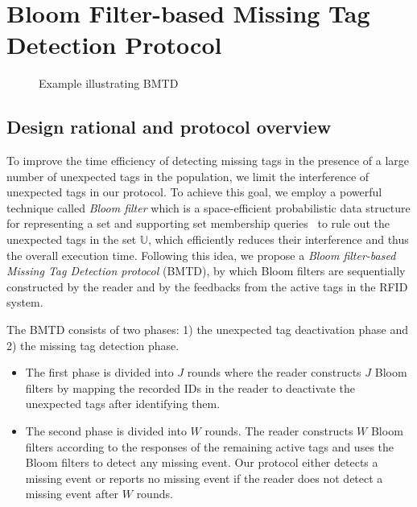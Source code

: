 \documentclass[10pt, twocolumn]{IEEEtran}
\begin{document}
\section{Bloom Filter-based Missing Tag Detection Protocol}
\label{sec:protocol}

\begin{figure*}[htbp]
\centering
{}
\caption{Example illustrating BMTD}
\end{figure*}

\subsection{Design rational and protocol overview}
To improve the time efficiency of detecting missing tags in the presence of a large number of unexpected tags in the population, we limit the interference of unexpected tags in our protocol. To achieve this goal, we employ a powerful technique called \textit{Bloom filter} which is a space-efficient probabilistic data structure for representing a set and supporting set membership queries~\cite{bloom1970space} to rule out the unexpected tags in the set $\mathbb{U}$, which efficiently reduces their interference and thus the overall execution time. Following this idea, we propose a \textit{Bloom filter-based Missing Tag Detection protocol} (BMTD), by which Bloom filters are sequentially constructed by the reader and by the feedbacks from the active tags in the RFID system.

The BMTD consists of two phases: 1) the unexpected tag deactivation phase and 2) the missing tag detection phase.
\begin{itemize}
\item The first phase is divided into $J$ rounds where the reader constructs $J$ Bloom filters by mapping the recorded IDs in the reader to deactivate the unexpected tags after identifying them.
\item The second phase is divided into $W$ rounds. The reader constructs $W$ Bloom filters according to the responses of the remaining active tags and uses the Bloom filters to detect any missing event. Our protocol either detects a missing event or reports no missing event if the reader does not detect a missing event after $W$ rounds.
\end{itemize}
\end{document}
